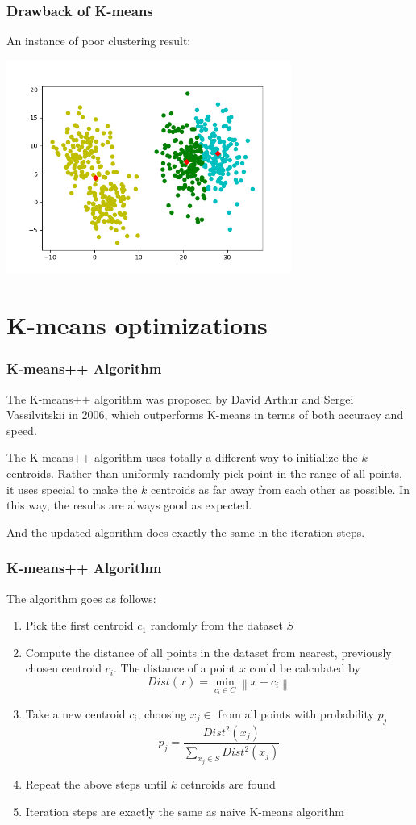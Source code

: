 \documentclass[9pt]{beamer}
\newcommand{\ccb}[1]{{\color{blue}#1}}
\newcommand{\ccp}[1]{{\color{purple}#1}}
\begin{document}
\begin{frame}
	\frametitle{Drawback of K-means}
	An instance of poor clustering result:
	\centerline{\includegraphics[width=0.7\textwidth]{figures/fig.png}}

\end{frame}

\section{K-means optimizations}

\begin{frame}
	\frametitle{K-means++ Algorithm}
	The K-means++ algorithm was proposed by David Arthur and Sergei Vassilvitskii in 2006, which outperforms K-means in terms of both accuracy and speed.
	\pause
	\par The K-means++ algorithm uses totally a different way to initialize the $k$ centroids. Rather than uniformly randomly pick point in the range of all points, it uses special to \ccp{make the $k$ centroids as far away from each other} as possible.
	In this way, the results are always good as expected.
	\pause
	\par And the updated algorithm does exactly the same in the iteration steps.

\end{frame}

\begin{frame}
	\frametitle{K-means++ Algorithm}
	The algorithm goes as follows:
	\begin{enumerate}
		\item Pick the first centroid $c_1$ \ccp{randomly} from the dataset $S$
		\item Compute the distance of all points in the dataset from \ccp{nearest, previously chosen centroid $c_i$}. The distance of a point $x$ could be calculated by \ccb{$$ Dist(x) =\min_{c_i \in C} {\left\lVert x-c_i\right\rVert } $$}
		\item Take a new centroid $c_i$, choosing $x_j \in $ from all points with probability $p_j$ \ccb{$$p_j = \frac{Dist^2(x_j)}{\sum_{x_j \in S} Dist^2(x_j)} $$}
		\item \ccp{Repeat} the above steps until $k$ cetnroids are found
		\item Iteration steps are exactly the same as naive K-means algorithm
	\end{enumerate}

\end{frame}
\end{document}
